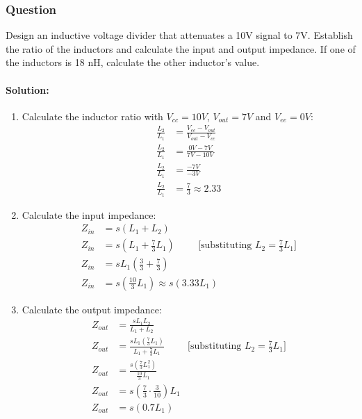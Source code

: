 \subsubsection{Question}
Design an inductive voltage divider that attenuates a 10V signal to 7V.
Establish the ratio of the inductors and calculate the input and output
impedance. If one of the inductors is 18 nH, calculate the other inductor's
value.
\paragraph{Solution:}
\begin{enumerate}
  \item Calculate the inductor ratio with \(V_{cc} = 10V\), \(V_{out} = 7V\)
    and \(V_{ee} = 0V\):
    \begin{align*}
      \frac{L_2}{L_1} &= \frac{V_{ee} - V_{out}}{V_{out} - V_{cc}} \\
      \frac{L_2}{L_1} &= \frac{0V - 7V}{7V - 10V} \\
      \frac{L_2}{L_1} &= \frac{-7V}{-3V} \\
      \frac{L_2}{L_1} &= \frac{7}{3} \approx 2.33
    \end{align*}
  \item Calculate the input impedance:
    \begin{align*}
      Z_{in} &= s(L_1 + L_2) \\
      Z_{in} &= s\left(L_1 + \frac{7}{3}L_1\right) \hspace{1cm} \text{[substituting \(L_2 = \frac{7}{3}L_1\)]} \\
      Z_{in} &= sL_1\left(\frac{3}{3} + \frac{7}{3}\right) \\
      Z_{in} &= s\left(\frac{10}{3}L_1\right) \approx s(3.33L_1)
    \end{align*}
  \item Calculate the output impedance:
    \begin{align*}
      Z_{out} &= \frac{sL_1 L_2}{L_1+L_2} \\
      Z_{out} &= \frac{sL_1\left(\frac{7}{3}L_1\right)}{L_1 + \frac{7}{3}L_1} \hspace{1cm} \text{[substituting \(L_2 = \frac{7}{3}L_1\)]} \\
      Z_{out} &= \frac{s\left(\frac{7}{3}L_1^2\right)}{\frac{10}{3}L_1} \\
      Z_{out} &= s\left(\frac{7}{3} \cdot \frac{3}{10}\right)L_1 \\
      Z_{out} &= s(0.7L_1)
    \end{align*}

\end{enumerate}
